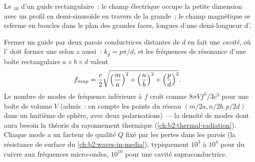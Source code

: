 \begin{omfigure}

{\small Le $_{10}$ d'un guide rectangulaire~: le champ électrique
occupe la petite dimension avec un profil en demi-sinusoïde en travers de la
grande~; le champ magnétique se referme en boucles dans le plan des grandes
faces, longues d'une demi-longueur d'.}
\end{omfigure}

\begin{proposition}\label{prop:b2:guided-waves:cavity}
Fermer un guide par deux parois conductrices distantes de $d$ en fait
une \emph{cavité}, où l' doit former une 
selon $z$ aussi~: $k_g = p\pi/d$, et les fréquences de résonance d'une
boîte rectangulaire $a \times b \times d$ valent
\[
f_{mnp} = \frac c2\sqrt{\Bigl(\frac ma\Bigr)^2 + \Bigl(\frac nb\Bigr)^2 + \Bigl(\frac pd\Bigr)^2} .
\]
Le nombre de modes de fréquence inférieure à $f$ croît comme $8\pi V f^3/3c^3$ pour
une boîte de volume $V$ (admis~: on compte les points du réseau
$(m/2a, n/2b, p/2d)$ dans un huitième de sphère, avec deux polarisations)
--- la densité de modes dont aura besoin la théorie du rayonnement
thermique (\cref{ch:b2:thermal-radiation}). Chaque mode a un facteur de qualité
$Q$ fixé par les pertes dans les parois (la résistance de surface du
\cref{ch:b2:waves-in-media}), typiquement $10^3$ à $10^4$ pour du cuivre aux
fréquences micro-ondes, $10^{10}$ pour une cavité supraconductrice.
\end{proposition}

